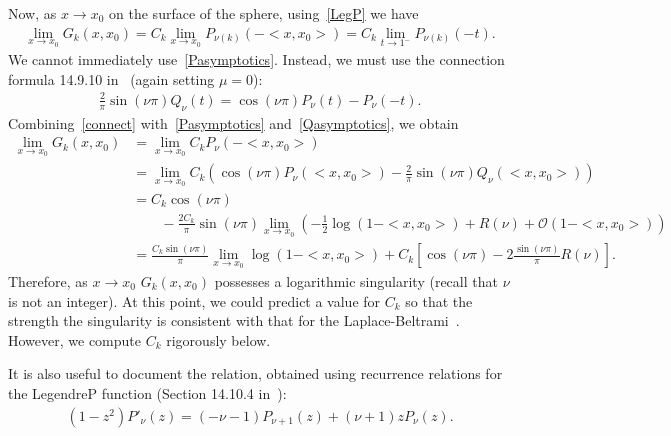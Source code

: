 \documentclass[final]{siamltex}
\newcommand{\C}{C_k}
\newcommand{\bigO} {\mathcal{O}}
\begin{document}
Now, as $x\rightarrow x_{0}$ on the surface of the sphere,
using~\eqref{LegP} we have 
\begin{align*}
  \lim_{x\rightarrow x_{0}}G_k(x,x_{0}) =
  \C\lim_{x\rightarrow x_{0}} P_{\nu(k)}\left(-<x,x_{0}>\right) =
  \C\lim_{t\rightarrow 1^-}P_{\nu(k)}\left(-t\right).
\end{align*}
We cannot immediately use~\eqref{Pasymptotics}. Instead, we must use the connection formula 14.9.10 in~\cite{fatAbramowitz} (again setting $\mu=0$):
\begin{align}
  \label{connect}
  \frac{2}{\pi}\sin(\nu \pi)Q_\nu(t)= \cos(\nu\pi)P_\nu(t) - P_\nu(-t).
\end{align}
Combining~\eqref{connect} with~\eqref{Pasymptotics}
and~\eqref{Qasymptotics}, we obtain
\begin{align}
  \lim_{x\rightarrow x_{0}}G_k(x,x_{0}) &= \lim_{x\rightarrow x_{0}}
      \C P_{\nu}(-<x,x_{0}>) \nonumber \\
  &= \lim_{x\rightarrow x_{0} }\C\left(\cos(\nu\pi)
  P_{\nu}(<x,x_{0}>) - 
      \frac{2}{\pi}\sin(\nu \pi)Q_{\nu}(<x,x_0>)\right) \nonumber \\
  &= \C\cos(\nu\pi)  \\
  & \qquad - \frac{2\C}{\pi}\sin(\nu\pi)\lim_{x\rightarrow x_0} 
      \left(-\frac{1}{2}\log(1-<x,x_0>) + R(\nu) +
      \bigO(1-<x,x_0>)\right) \nonumber \\
  &=\frac{\C\sin(\nu\pi)}{\pi}\lim_{x\rightarrow x_0}
      \log(1-<x,x_0>) + \C\left[\cos(\nu\pi)-
      2\frac{\sin(\nu\pi)}{\pi}R(\nu)\right].
  \label{e:logSingularity}
\end{align}
Therefore, as $x\rightarrow x_{0}$ $G_k(x,x_{0})$ possesses a
logarithmic singularity (recall that $\nu$ is not an integer).  At this
point, we could predict a value for $\C$ so that the strength the
singularity is consistent with that for the
Laplace-Beltrami~\cite{gemmrich}.  However, we compute $\C$ rigorously
below.

It is also useful to document the relation, obtained using recurrence
relations for the LegendreP function (Section 14.10.4
in~\cite{fatAbramowitz}):
\begin{align*} 
  (1-z^2) P'_\nu(z) = (-\nu-1) P_{\nu+1}(z) + (\nu+1)z P_\nu(z).
\end{align*}
\end{document}
